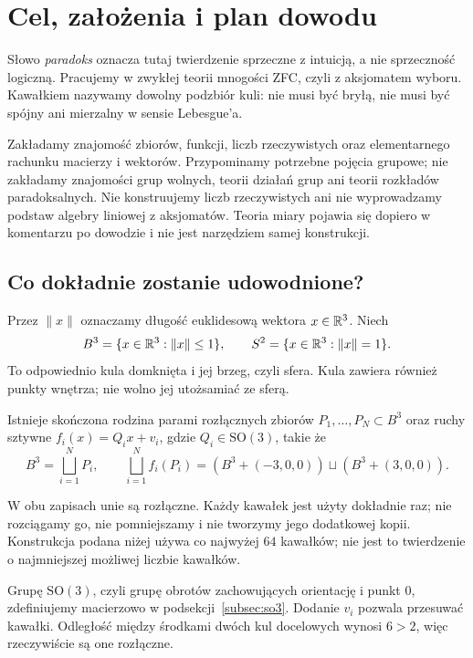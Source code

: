 \section{Cel, założenia i plan dowodu}
Słowo \emph{paradoks} oznacza tutaj twierdzenie sprzeczne z intuicją, a nie sprzeczność logiczną. Pracujemy w zwykłej teorii mnogości ZFC, czyli z aksjomatem wyboru. Kawałkiem nazywamy dowolny podzbiór kuli: nie musi być bryłą, nie musi być spójny ani mierzalny w sensie Lebesgue'a.

Zakładamy znajomość zbiorów, funkcji, liczb rzeczywistych oraz elementarnego rachunku macierzy i wektorów. Przypominamy potrzebne pojęcia grupowe; nie zakładamy znajomości grup wolnych, teorii działań grup ani teorii rozkładów paradoksalnych. Nie konstruujemy liczb rzeczywistych ani nie wyprowadzamy podstaw algebry liniowej z aksjomatów. Teoria miary pojawia się dopiero w komentarzu po dowodzie i nie jest narzędziem samej konstrukcji.

\subsection{Co dokładnie zostanie udowodnione?}
Przez $\|x\|$ oznaczamy długość euklidesową wektora $x\in\mathbb R^3$. Niech
\[
 B^3=\{x\in\mathbb R^3:\|x\|\le1\},\qquad S^2=\{x\in\mathbb R^3:\|x\|=1\}.
\]
To odpowiednio kula domknięta i jej brzeg, czyli sfera. Kula zawiera również punkty wnętrza; nie wolno jej utożsamiać ze sferą.

\begin{twierdzenie}\label{tw:banach-tarski}
Istnieje skończona rodzina parami rozłącznych zbiorów $P_1,\ldots,P_N\subset B^3$ oraz ruchy sztywne $f_i(x)=Q_ix+v_i$, gdzie $Q_i\in\mathrm{SO}(3)$, takie że
\[
 B^3=\bigsqcup_{i=1}^{N}P_i,\qquad
 \bigsqcup_{i=1}^{N}f_i(P_i)
 =(B^3+(-3,0,0))\sqcup(B^3+(3,0,0)).
\]
\end{twierdzenie}
W obu zapisach unie są rozłączne. Każdy kawałek jest użyty dokładnie raz; nie rozciągamy go, nie pomniejszamy i nie tworzymy jego dodatkowej kopii. Konstrukcja podana niżej używa co najwyżej $64$ kawałków; nie jest to twierdzenie o najmniejszej możliwej liczbie kawałków.

Grupę $\mathrm{SO}(3)$, czyli grupę obrotów zachowujących orientację i punkt $0$, zdefiniujemy macierzowo w podsekcji~\ref{subsec:so3}. Dodanie $v_i$ pozwala przesuwać kawałki. Odległość między środkami dwóch kul docelowych wynosi $6>2$, więc rzeczywiście są one rozłączne.

